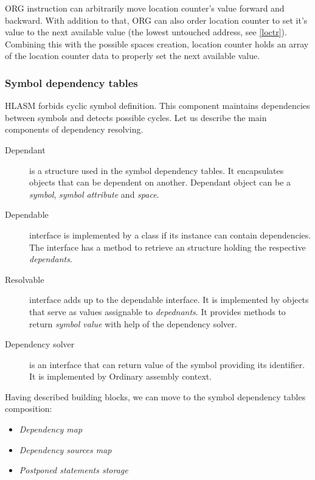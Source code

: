 \vspace{0.5cm}

ORG instruction can arbitrarily move location counter's value forward and backward. With addition to that, ORG can also order location counter to set it's value to the next available value (the lowest untouched address, see \cref{loctr}). Combining this with the possible spaces creation, location counter holds an array of the location counter data to properly set the next available value.

\subsubsection{Symbol dependency tables}
\label{symbol_dependency_tables}
HLASM forbids cyclic symbol definition. This component maintains dependencies between symbols and detects possible cycles.
Let us describe the main components of dependency resolving.

\begin{description}
	\item[Dependant] is a structure used in the symbol dependency tables. It encapsulates objects that can be dependent on another. Dependant object can be a \emph{symbol}, \emph{symbol attribute} and \emph{space}.
	\item[Dependable] interface is implemented by a class if its instance can contain dependencies. The interface has a method to retrieve an structure holding the respective \emph{dependants}. 
	\item[Resolvable] interface adds up to the dependable interface. It is implemented by objects that serve as values assignable to \emph{depednants}. It provides methods to return \emph{symbol value} with help of the dependency solver. 
	\item[Dependency solver] is an interface that can return value of the symbol providing its identifier. It is implemented by Ordinary assembly context.
\end{description}

\vspace{0.5cm}

Having described building blocks, we can move to the symbol dependency tables composition:
\begin{itemize}
	\item \emph{Dependency map}
	\item \emph{Dependency sources map}
	\item \emph{Postponed statements storage}
\end{itemize}

